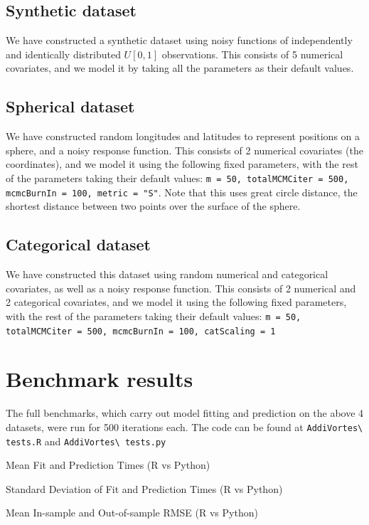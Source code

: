 \documentclass[11pt,twoside,a4paper]{article}
\begin{document}
\subsection{Synthetic dataset}
We have constructed a synthetic dataset using noisy functions of independently and identically distributed $U[0,1]$ observations. This consists of 5 numerical covariates, and we model it by taking all the parameters as their default values.
\subsection{Spherical dataset}
We have constructed random longitudes and latitudes to represent positions on a sphere, and a noisy response function. This consists of 2 numerical covariates (the coordinates), and we model it using the following fixed parameters, with the rest of the parameters taking their default values: \texttt{m = 50, totalMCMCiter = 500, mcmcBurnIn = 100, metric = "S"}. Note that this uses great circle distance, the shortest distance between two points over the surface of the sphere.
\subsection{Categorical dataset}
We have constructed this dataset using random numerical and categorical covariates, as well as a noisy response function. This consists of 2 numerical and 2 categorical covariates, and we model it using the following fixed parameters, with the rest of the parameters taking their default values: \texttt{m = 50, totalMCMCiter = 500, mcmcBurnIn = 100, catScaling = 1}
\section{Benchmark results}
The full benchmarks, which carry out model fitting and prediction on the above 4 datasets, were run for 500 iterations each. The code can be found at \nolinkurl{AddiVortes\ tests.R} and \nolinkurl{AddiVortes\ tests.py}

\begin{table}[htbp]
\centering
\caption{Mean Fit and Prediction Times (R vs Python)}
\label{tab:fit_pred_means}
\begin{adjustbox}{width=\textwidth}

\end{adjustbox}
\end{table}
\newpage

\begin{table}[htbp]
\centering
\caption{Standard Deviation of Fit and Prediction Times (R vs Python)}
\label{tab:fit_pred_sds}
\begin{adjustbox}{width=\textwidth}

\end{adjustbox}
\end{table}
\begin{table}[htbp]
\centering
\caption{Mean In-sample and Out-of-sample RMSE (R vs Python)}
\label{tab:rmse_means}
\begin{adjustbox}{width=\textwidth}

\end{adjustbox}
\end{table}
\end{document}
